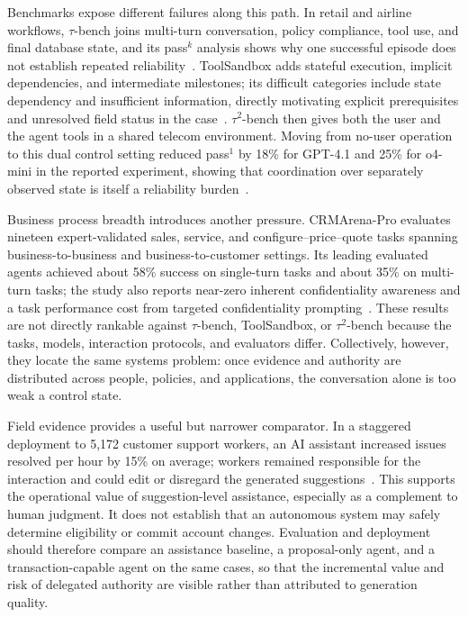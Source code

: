 Benchmarks expose different failures along this path. In retail and airline workflows, $\tau$-bench joins multi-turn conversation, policy compliance, tool use, and final database state, and its pass$^k$ analysis shows why one successful episode does not establish repeated reliability~\cite{yao2024taubench}. ToolSandbox adds stateful execution, implicit dependencies, and intermediate milestones; its difficult categories include state dependency and insufficient information, directly motivating explicit prerequisites and unresolved field status in the case~\cite{lu2025toolsandbox}. $\tau^2$-bench then gives both the user and the agent tools in a shared telecom environment. Moving from no-user operation to this dual control setting reduced pass$^1$ by 18\% for GPT-4.1 and 25\% for o4-mini in the reported experiment, showing that coordination over separately observed state is itself a reliability burden~\cite{barres2025tau2bench}.

Business process breadth introduces another pressure. CRMArena-Pro evaluates nineteen expert-validated sales, service, and configure--price--quote tasks spanning business-to-business and business-to-customer settings. Its leading evaluated agents achieved about 58\% success on single-turn tasks and about 35\% on multi-turn tasks; the study also reports near-zero inherent confidentiality awareness and a task performance cost from targeted confidentiality prompting~\cite{huang2025crmarenapro}. These results are not directly rankable against $\tau$-bench, ToolSandbox, or $\tau^2$-bench because the tasks, models, interaction protocols, and evaluators differ. Collectively, however, they locate the same systems problem: once evidence and authority are distributed across people, policies, and applications, the conversation alone is too weak a control state.

Field evidence provides a useful but narrower comparator. In a staggered deployment to 5,172 customer support workers, an AI assistant increased issues resolved per hour by 15\% on average; workers remained responsible for the interaction and could edit or disregard the generated suggestions~\cite{brynjolfsson2025generativeaiatwork}. This supports the operational value of suggestion-level assistance, especially as a complement to human judgment. It does not establish that an autonomous system may safely determine eligibility or commit account changes. Evaluation and deployment should therefore compare an assistance baseline, a proposal-only agent, and a transaction-capable agent on the same cases, so that the incremental value and risk of delegated authority are visible rather than attributed to generation quality.

